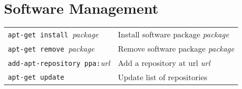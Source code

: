 \section{Software Management}
\begin{tabular}{@{}p{\the\MyLen}%
				@{}p{\linewidth-\the\MyLen}}
	\verb!apt-get install !\textit{package}	& Install software package \textit{package}\\
	\verb!apt-get remove !\textit{package} & Remove software package \textit{package}\\
	\verb!add-apt-repository ppa:!\textit{url} & Add a repository at url \textit{url}\\
	\verb!apt-get update! & Update list of repositories\\
\end{tabular}

